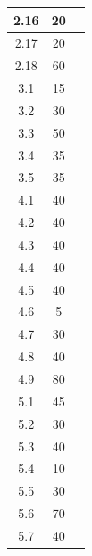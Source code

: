 \documentclass[11pt]{article}
\begin{document}
\begin{center}
\begin{tabular}{|c|c|c|}
2.16 & 20 &  \\\hline
2.17 & 20 &  \\\hline
2.18 & 60 & \\\hline
3.1 & 15 & \\\hline
3.2 & 30 & \\\hline
3.3 & 50 & \\\hline
3.4 & 35 & \\\hline
3.5 & 35 & \\\hline
4.1 & 40 & \\\hline
4.2 & 40 & \\\hline
4.3 & 40 & \\\hline
4.4 & 40 & \\\hline
4.5 & 40 & \\\hline
4.6 & 5 & \\\hline
4.7 & 30 & \\\hline
4.8 & 40 & \\\hline
4.9 & 80 & \\\hline
5.1 & 45 & \\\hline
5.2 & 30 & \\\hline
5.3 & 40 & \\\hline
5.4 & 10 & \\\hline
5.5 & 30 & \\\hline
5.6 & 70 & \\\hline
5.7 & 40 & \\\hline
\end{tabular}

\end{center}
\end{document}
